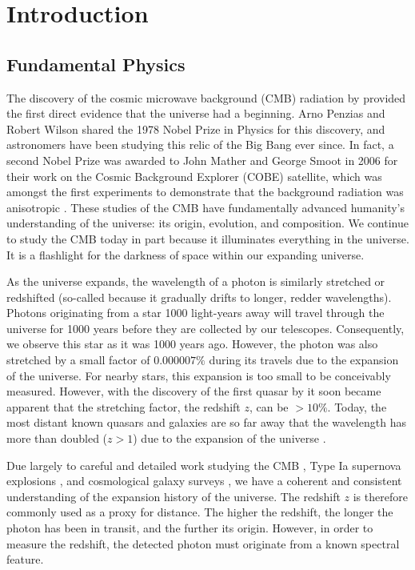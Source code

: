 \chapter{Introduction}
\label{chapter1}

\begin{bibunit}

\section{Fundamental Physics}

The discovery of the cosmic microwave background (CMB) radiation by \citet{1965ApJ...142..419P}
provided the first direct evidence that the universe had a beginning. Arno Penzias and Robert Wilson
shared the 1978 Nobel Prize in Physics for this discovery, and astronomers have been studying this
relic of the Big Bang ever since. In fact, a second Nobel Prize was awarded to John Mather and
George Smoot in 2006 for their work on the Cosmic Background Explorer (COBE) satellite, which was
amongst the first experiments to demonstrate that the background radiation was anisotropic
\citep{1992ApJ...396L...1S}. These studies of the CMB have fundamentally advanced humanity's
understanding of the universe: its origin, evolution, and composition. We continue to study the CMB
today in part because it illuminates everything in the universe. It is a flashlight for the darkness
of space within our expanding universe.

As the universe expands, the wavelength of a photon is similarly stretched or redshifted (so-called
because it gradually drifts to longer, redder wavelengths). Photons originating from a star 1000
light-years away will travel through the universe for 1000 years before they are collected by our
telescopes. Consequently, we observe this star as it was 1000 years ago. However, the photon was
also stretched by a small factor of $0.000007\%$ during its travels due to the expansion of the
universe.  For nearby stars, this expansion is too small to be conceivably measured.  However, with
the discovery of the first quasar by \citet{1963Natur.197.1040S} it soon became apparent that the
stretching factor, the redshift $z$, can be $>10\%$. Today, the most distant known quasars and
galaxies are so far away that the wavelength has more than doubled ($z > 1$) due to the expansion of
the universe \citep[e.g.,][]{2011Natur.474..616M, 2015ApJ...810L..12Z, 2016ApJ...819..129O,
2018Natur.553..473B}.

Due largely to careful and detailed work studying the CMB \citep[e.g.,][]{2013ApJS..208...19H,
2016A&A...594A..25P}, Type Ia supernova explosions \citep[e.g.,][]{1998AJ....116.1009R,
1999ApJ...517..565P}, and cosmological galaxy surveys \citep[e.g.,][]{2001MNRAS.328.1039C}, we have
a coherent and consistent understanding of the expansion history of the universe. The redshift $z$
is therefore commonly used as a proxy for distance. The higher the redshift, the longer the photon
has been in transit, and the further its origin. However, in order to measure the redshift, the
detected photon must originate from a known spectral feature.


\end{bibunit}
